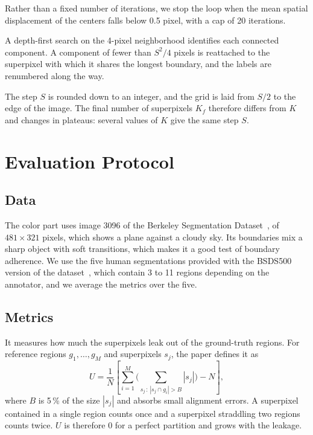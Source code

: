  Rather than a fixed number of iterations, we stop the loop when the mean spatial
displacement of the centers falls below 0.5 pixel, with a cap of 20 iterations.

 A depth-first search on the 4-pixel neighborhood
identifies each connected component. A
component of fewer than $S^2/4$ pixels is reattached to the
superpixel with which it shares the longest boundary, and
the labels are renumbered along the way.

 The step $S$ is rounded
down to an integer, and the grid is laid from
$S/2$ to the edge of the image. The final number of
superpixels $K_f$ therefore differs from $K$ and changes in plateaus:
several values of $K$ give the same step $S$.

\section{Evaluation Protocol}\label{s:proto}
\subsection{Data}
The color part uses image 3096 of the Berkeley Segmentation Dataset~\cite{martin}, of $481 \times 321$ pixels,
which shows a plane against a cloudy sky. Its boundaries
mix a sharp object with soft transitions, which
makes it a good test of boundary adherence. We
use the five human segmentations provided with
the BSDS500 version of the dataset~\cite{arbelaez}, which contain 3
to 11 regions depending on the annotator, and we average the metrics over the five.

\subsection{Metrics}
 It measures how much
the superpixels leak out of the ground-truth regions.
For reference regions $g_1, \dots, g_M$ and
superpixels $s_j$, the paper defines it as
\begin{equation}\label{e:U}
U = \frac{1}{N}\left[\sum_{i=1}^{M}\Biggl(\sum_{s_j \,:\, |s_j \cap g_i| > B} |s_j|\Biggr) - N\right],
\end{equation}
where $B$ is 5\,\% of the size $|s_j|$ and absorbs small alignment errors.
A superpixel contained in a single
region counts once and a superpixel straddling
two regions counts twice. $U$ is therefore 0 for a
perfect partition and grows with the leakage.

